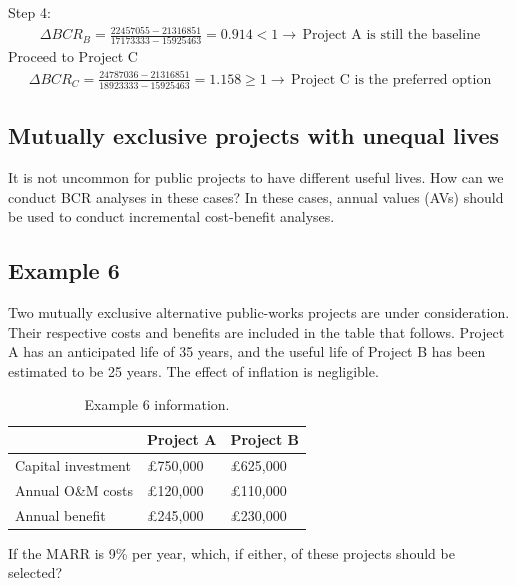 Step 4:
\begin{gather}
  \Delta BCR_{B} = \frac{22457055-21316851}{17173333-15925463} = 0.914 < 1 \rightarrow\, \textrm{Project A is still the baseline}
\end{gather}
Proceed to Project C
\begin{gather}
  \Delta BCR_{C} = \frac{24787036-21316851}{18923333-15925463} = 1.158 \geq 1 \rightarrow\, \textrm{Project C is the preferred option}
\end{gather}
\subsection{Mutually exclusive projects with unequal lives}
It is not uncommon for public projects to have different useful lives. How can we conduct BCR analyses in these cases? In these cases, annual values (AVs) should be used to conduct incremental cost-benefit analyses.
\subsection{Example 6}
Two mutually exclusive alternative public-works projects are under consideration. Their respective costs and benefits are included in the table that follows. Project A has an anticipated life of 35 years, and the useful life of Project B has been estimated to be 25 years. The effect of inflation is negligible.
\begin{table}[H]
  \centering
  \begin{tabular}{@{}lll@{}}
    \toprule
                       & Project A       & Project B       \\
    \midrule
    Capital investment & \pounds 750,000 & \pounds 625,000 \\
    Annual O\&M costs  & \pounds 120,000 & \pounds 110,000 \\
    Annual benefit     & \pounds 245,000 & \pounds 230,000 \\
    \bottomrule
  \end{tabular}
  \caption{Example 6 information.}
\end{table}
If the MARR is 9\% per year, which, if either, of these projects should be selected?

